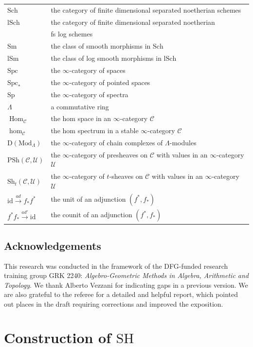 \documentclass[10pt]{amsart}
\theoremstyle{definition}
\theoremstyle{remark}
\numberwithin{equation}{subsection}
\newcommand{\cC}{\mathcal{C}}
\newcommand{\cU}{\mathcal{U}}
\DeclareMathOperator{\Hom}{Hom}
\newcommand{\id}{\mathrm{id}}
\newcommand{\Spt}{\mathrm{Sp}}
\newcommand{\Sm}{\mathrm{Sm}}
\newcommand{\SH}{\mathrm{SH}}
\newcommand{\DLambda}{\mathrm{D}(\mathrm{Mod}_{\Lambda})}
\newcommand{\Sch}{\mathrm{Sch}}
\newcommand{\lSch}{\mathrm{lSch}}
\newcommand{\lSm}{\mathrm{lSm}}
\newcommand{\infPsh}{\mathrm{PSh}}
\newcommand{\infShv}{\mathrm{Sh}}
\newcommand{\Spc}{\mathrm{Spc}}
\begin{document}
\begin{tabular}{l|l}
$\Sch$ & the category of finite dimensional separated noetherian schemes
\\
$\lSch$ &  the category of finite dimensional separated noetherian
\\
&  fs log schemes
\\
$\Sm$ & the class of smooth morphisms in $\Sch$
\\
$\lSm$ & the class of log smooth morphisms in $\lSch$
\\
$\Spc$ & the $\infty$-category of spaces
\\
$\Spc_*$ & the $\infty$-category of pointed spaces
\\
$\Spt$ & the $\infty$-category of spectra
\\
$\Lambda$ & a commutative ring
\\
$\Hom_{\cC}$ & the hom space in an $\infty$-category $\cC$
\\
$\hom_{\cC}$ & the hom spectrum in a stable $\infty$-category $\cC$
\\
$\DLambda$ & the $\infty$-category of chain complexes of $\Lambda$-modules
\\
$\infPsh(\cC,\cU)$ & the $\infty$-category of presheaves on $\cC$ with values in an $\infty$-category $\cU$
\\
$\infShv_t(\cC,\cU)$ & the $\infty$-category of $t$-sheaves on $\cC$ with values in an $\infty$-category $\cU$
\\
$\id\xrightarrow{ad}f_*f^*$ & the unit of an adjunction $(f^*,f_*)$
\\
$f^*f_*\xrightarrow{ad'}\id$ & the counit of an adjunction $(f^*,f_*)$
\end{tabular}

\subsection*{Acknowledgements}
This research was conducted in the framework of the DFG-funded research training group GRK 2240: \emph{Algebro-Geometric Methods in Algebra, Arithmetic and Topology}.
We thank Alberto Vezzani for indicating gaps in a previous version.
We are also grateful to the referee for a detailed and helpful report, which pointed out places in the draft requiring corrections and improved the exposition.



\section{Construction of \texorpdfstring{$\SH$}{SH}}
\end{document}
